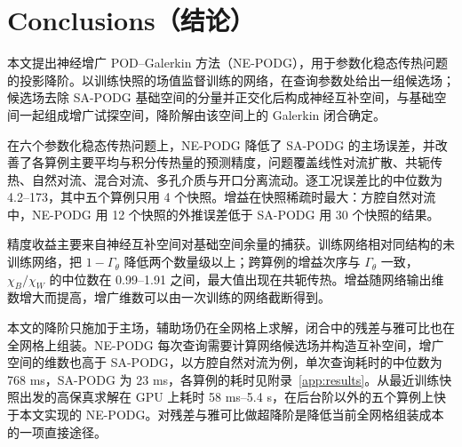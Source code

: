\section{Conclusions（结论）}
\label{sec:conclusions}

本文提出神经增广 POD–Galerkin 方法（NE-PODG），用于参数化稳态传热问题的投影降阶。以训练快照的场值监督训练的网络，在查询参数处给出一组候选场；候选场去除 SA-PODG 基础空间的分量并正交化后构成神经互补空间，与基础空间一起组成增广试探空间，降阶解由该空间上的 Galerkin 闭合确定。

在六个参数化稳态传热问题上，NE-PODG 降低了 SA-PODG 的主场误差，并改善了各算例主要平均与积分传热量的预测精度，问题覆盖线性对流扩散、共轭传热、自然对流、混合对流、多孔介质与开口分离流动。逐工况误差比的中位数为 4.2--173，其中五个算例只用 4 个快照。增益在快照稀疏时最大：方腔自然对流中，NE-PODG 用 12 个快照的外推误差低于 SA-PODG 用 30 个快照的结果。

精度收益主要来自神经互补空间对基础空间余量的捕获。训练网络相对同结构的未训练网络，把 $1-\Gamma_\theta$ 降低两个数量级以上；跨算例的增益次序与 $\Gamma_\theta$ 一致，$\chi_B/\chi_W$ 的中位数在 0.99--1.91 之间，最大值出现在共轭传热。增益随网络输出维数增大而提高，增广维数可以由一次训练的网络截断得到。

本文的降阶只施加于主场，辅助场仍在全网格上求解，闭合中的残差与雅可比也在全网格上组装。NE-PODG 每次查询需要计算网络候选场并构造互补空间，增广空间的维数也高于 SA-PODG，以方腔自然对流为例，单次查询耗时的中位数为 768 ms，SA-PODG 为 23 ms，各算例的耗时见附录~\ref{app:results}。从最近训练快照出发的高保真求解在 GPU 上耗时 58 ms--5.4 s，在后台阶以外的五个算例上快于本文实现的 NE-PODG。对残差与雅可比做超降阶是降低当前全网格组装成本的一项直接途径。
